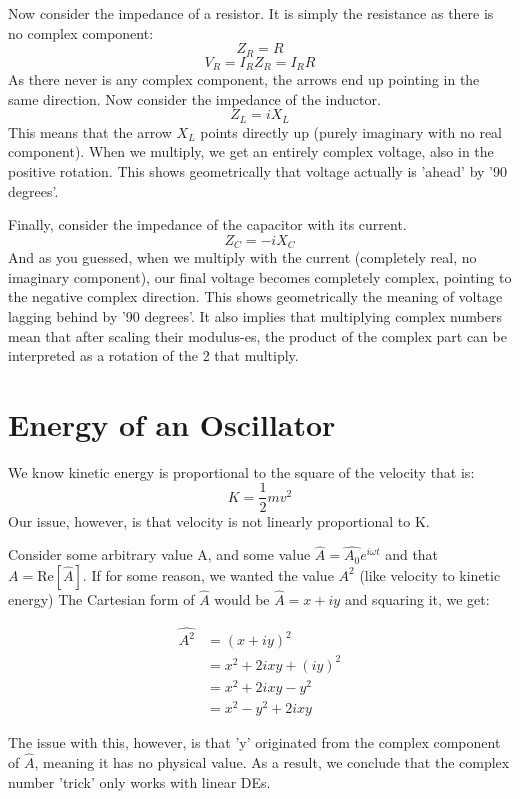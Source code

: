\documentclass[10pt]{report}
\begin{document}
{{{Now consider the impedance of a resistor. It is simply the resistance as there is no complex component: \[
Z_{R}=R
\] \[
V_{R}=I_{R}Z_{R}=I_{R}R
\] As there never is any complex component, the arrows end up pointing in the same direction. Now consider the impedance of the inductor. \[
Z_{L}=iX_{L}
\] This means that the arrow $X_{L}$ points directly up (purely imaginary with no real component). When we multiply, we get an entirely complex voltage, also in the positive rotation. This shows geometrically that voltage actually is 'ahead' by '90 degrees'.

Finally, consider the impedance of the capacitor with its current. \[
Z_{C}=-iX_{C}
\] And as you guessed, when we multiply with the current (completely real, no imaginary component), our final voltage becomes completely complex, pointing to the negative complex direction. This shows geometrically the meaning of voltage lagging behind by '90 degrees'. It also implies that multiplying complex numbers mean that after scaling their modulus-es, the product of the complex part can be interpreted as a rotation of the 2 that multiply.
}
\section{Energy of an Oscillator}
\par{We know kinetic energy is proportional to the square of the velocity that is: \[
K=\frac{1}{2}mv^{2}
\] Our issue, however, is that velocity is not linearly proportional to K. 

Consider some arbitrary value A, and some value $\hat{A}=\hat{A_{0}}e^{i\omega t}$ and that $A=\mathrm{Re}\left[\hat{A}\right]$. If for some reason, we wanted the value $A^{2}$ (like velocity to kinetic energy) The Cartesian form of $\hat{A}$ would be  $\hat{A}=x+iy$ and squaring it, we get: }
\begin{align*}
	\hat{A^{2}}&=\left(x+iy\right)^{2} \\
			   &=x^{2}+2ixy+\left(iy\right)^{2} \\
			   &=x^{2}+2ixy-y^{2} \\
			   &=x^{2}-y^{2}+2ixy
\end{align*}
\par{The issue with this, however, is that 'y' originated from the complex component of $\hat{A}$, meaning it has no physical value. As a result, we conclude that the complex number 'trick' only works with linear DEs.

}}}
\end{document}
